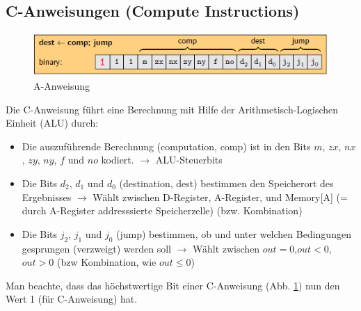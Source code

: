 \documentclass[12pt]{report}
\begin{document}
\subsection{C-Anweisungen (Compute Instructions)}
\begin{figure}[H]
  \caption{A-Anweisung}
  \label{fig:maschinensprache_c-anweisung}
  \centering
  \includegraphics{maschinensprache_c-anweisung}
\end{figure}
Die C-Anweisung führt eine Berechnung mit Hilfe der Arithmetisch-Logischen Einheit (ALU) durch:
\begin{itemize}
  \item Die auszuführende Berechnung (computation, comp) ist in den Bits $m$, $zx$, $nx$, $zy$, $ny$, $f$ und $no$ kodiert.
        \subitem $\rightarrow$ ALU-Steuerbits
        
  \item Die Bits $d_2$, $d_1$ und $d_0$ (destination, dest) bestimmen den Speicherort des Ergebnisses
        \subitem $\rightarrow$ Wählt zwischen D-Register, A-Register, und Memory[A] (= durch A-Register addresssierte Speicherzelle) (bzw. Kombination)
        
  \item Die Bits $j_2$, $j_1$ und $j_0$ (jump) bestimmen, ob und unter welchen Bedingungen gesprungen (verzweigt) werden soll
        \subitem $\rightarrow$ Wählt zwischen $out = 0$,$out<0$, $out>0$ (bzw Kombination, wie $out \leq 0$)
\end{itemize}

Man beachte, dass das höchstwertige Bit einer C-Anweisung (Abb. \ref{fig:maschinensprache_c-anweisung}) nun den Wert 1 (für C-Anweisung) hat.
\end{document}
